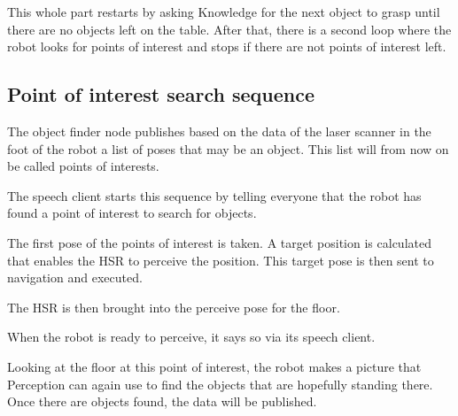 \documentclass[main.tex]{subfiles}
\begin{document}
	\begin{planning}
	This whole part restarts by asking Knowledge for the next object to grasp until there are no objects left on the table. After that, there is a second loop where the robot looks for points of interest and stops if there are not points of interest left.
	\end{planning}
	
	\subsection{Point of interest search sequence}
	\begin{navigation}
	The object finder node publishes based on the data of the laser scanner in the foot of the robot a list of poses that may be an object. This list will from now on be called points of interests.
	\end{navigation}
	
    \begin{nlp}
    The speech client starts this sequence by telling everyone that the robot has found a point of interest to search for objects.
    \end{nlp}
    
    \begin{planning}
    The first pose of the points of interest is taken. A target position is calculated that enables the HSR to perceive the position.
    This target pose is then sent to navigation and executed.
   \end{planning}
   
    \begin{manipulation}
    The HSR is then brought into the perceive pose for the floor.
    \end{manipulation}
    
    \begin{nlp}
    When the robot is ready to perceive, it says so via its speech client.
    \end{nlp}
      
    \begin{perception}
	Looking at the floor at this point of interest, the robot makes a picture that Perception can again use to find the objects that are hopefully standing there. Once there are objects found, the data will be published.
	\end{perception}
    
\end{document}
